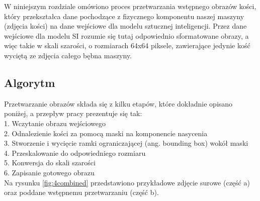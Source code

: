 W niniejszym rozdziale omówiono proces przetwarzania wstępnego obrazów kości,
który przekształca dane pochodzące z fizycznego komponentu naszej maszyny (zdjęcia kości) na dane wejściowe dla modelu sztucznej inteligencji.
Przez dane wejściowe dla modelu SI rozumie się tutaj odpowiednio sformatowane obrazy, a więc takie w skali szarości,
o rozmiarach 64x64 piksele, zawierające jedynie kość wyciętą ze zdjęcia całego bębna maszyny.

\subsection{Algorytm}

Przetwarzanie obrazów składa się z kilku etapów, które dokładnie opisano poniżej, a przepływ pracy prezentuje się tak: \\
1. Wczytanie obrazu wejściowego \\
2. Odnalezienie kości za pomocą maski na komponencie nasycenia \\
3. Stworzenie i wycięcie ramki ograniczającej (ang. bounding box) wokół maski \\
4. Przeskalowanie do odpowiedniego rozmiaru \\
5. Konwersja do skali szarości \\
6. Zapisanie gotowego obrazu \\

\iffalse
Na rysunku \ref{fig:4combined} przedstawiono przykładowe zdjęcie surowe (część a)
oraz poddane wstępnemu przetwarzaniu (część b).

